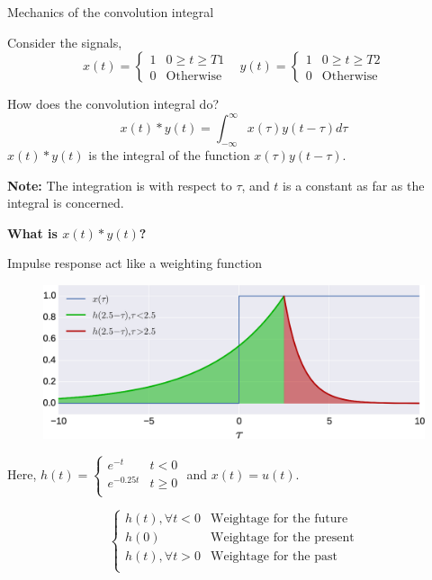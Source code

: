 \documentclass{beamer}
\begin{document}
\begin{frame}{Mechanics of the convolution integral}

Consider the signals,
\[ x(t) = \begin{cases}
1 & 0 \geq t \geq T1 \\
0 & \text{Otherwise}
\end{cases} \,\,\,\,\, y(t) = \begin{cases}
1 & 0 \geq t \geq T2 \\
0 & \text{Otherwise}
\end{cases} \]

How does the convolution integral do? 
\[ x(t) * y(t) = \int_{-\infty}^{\infty}x(\tau)y(t - \tau)d\tau \]
\pause
$x(t)*y(t)$ is the integral of the function $x(\tau)y(t - \tau)$.
\vspace{2mm}

\textbf{Note:} The integration is with respect to $\tau$, and $t$ is a constant as far as the integral is concerned.
\vspace{3mm}

\textbf{What is $x(t) * y(t)$?}
\end{frame}

\begin{frame}{Impulse response act like a weighting function}

\begin{figure}
\includegraphics[width=\textwidth]{img/imp_resp_mech.eps}
\end{figure}

Here, $h(t) = \begin{cases}
e^{-t} & t < 0 \\
e^{-0.25t} & t \geq 0 \\
\end{cases}$ and $x(t) = u(t)$.

\vspace{2mm}

\[ \begin{cases}
h(t), \forall t < 0 & \text{Weightage for the future} \\
h(0) & \text{Weightage for the present} \\
h(t), \forall t > 0 & \text{Weightage for the past} \\
\end{cases} \]
\end{frame}
\end{document}
